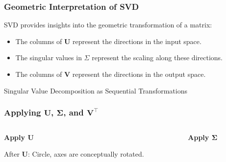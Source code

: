\documentclass[aspectratio=169]{beamer}
\begin{document}
\begin{frame}
\frametitle{Geometric Interpretation of SVD}
SVD provides insights into the geometric transformation of a matrix:
\begin{itemize}
    \item<2-> The columns of \( \mathbf{U} \) represent the directions in the input space.
    \item<3-> The singular values in \( \Sigma \) represent the scaling along these directions.
    \item<4-> The columns of \( \mathbf{V} \) represent the directions in the output space.
\end{itemize}
\end{frame}


\begin{frame}{Singular Value Decomposition as Sequential Transformations}
  \frametitle{Applying \( \mathbf{U} \), \( \mathbf{\Sigma} \), and \( \mathbf{V}^\top \)}
\pause
  \begin{columns}
    \begin{column}{0.25\textwidth}
      \centering
      \textbf{Apply \( \mathbf{U} \)}\\[0.5cm]
      
      
      {\footnotesize After \( \mathbf{U} \): Circle, axes are conceptually rotated.}
    \end{column}
    \pause
    \begin{column}{0.3\textwidth}
      \centering
      \textbf{Apply \( \mathbf{\Sigma} \)}\\[0.5cm]
      
\end{column}
\end{columns}
\end{frame}
\end{document}
